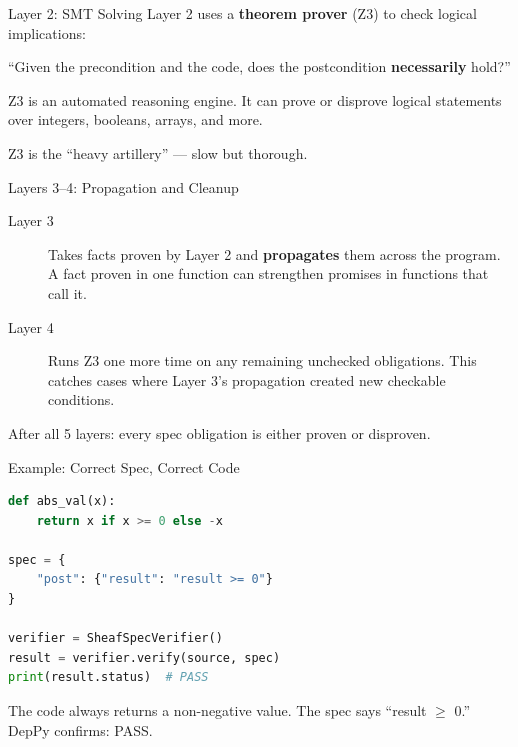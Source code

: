 \documentclass[aspectratio=169,10pt]{beamer}
\newcommand{\hint}[1]{\begin{center}
  \colorbox{hintbg}{\parbox{0.88\textwidth}{\centering\small #1}}\end{center}}
\begin{document}
\begin{frame}{Layer 2: SMT Solving}
Layer 2 uses a \textbf{theorem prover} (Z3) to check logical implications:
\vspace{0.5em}
\begin{center}
``Given the precondition and the code, does the postcondition \textbf{necessarily} hold?''
\end{center}
\vspace{0.3em}
Z3 is an automated reasoning engine. It can prove or disprove logical statements over integers, booleans, arrays, and more.
\vspace{0.3em}
\hint{Z3 is the ``heavy artillery'' --- slow but thorough.}
\end{frame}

\begin{frame}{Layers 3--4: Propagation and Cleanup}
\begin{description}
  \item[Layer 3] Takes facts proven by Layer 2 and \textbf{propagates} them across the program. A fact proven in one function can strengthen promises in functions that call it.
  \item[Layer 4] Runs Z3 one more time on any remaining unchecked obligations. This catches cases where Layer 3's propagation created new checkable conditions.
\end{description}
\vspace{0.3em}
After all 5 layers: every spec obligation is either \textcolor{safe}{proven} or \textcolor{danger}{disproven}.
\end{frame}

\begin{frame}[fragile]{Example: Correct Spec, Correct Code}
\begin{lstlisting}[language=Python, basicstyle=\ttfamily\scriptsize]
def abs_val(x):
    return x if x >= 0 else -x

spec = {
    "post": {"result": "result >= 0"}
}

verifier = SheafSpecVerifier()
result = verifier.verify(source, spec)
print(result.status)  # PASS
\end{lstlisting}
\vspace{0.3em}
The code always returns a non-negative value. The spec says ``result $\ge$ 0.''\\
DepPy confirms: \textcolor{safe}{PASS}.
\end{frame}
\end{document}
